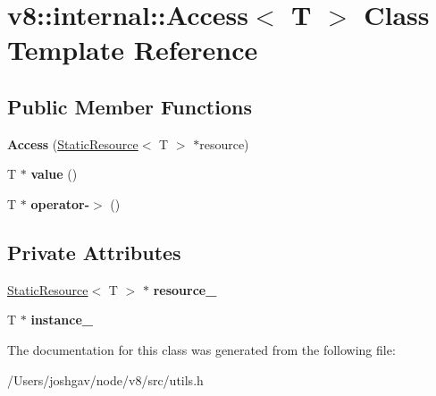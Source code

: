 \hypertarget{classv8_1_1internal_1_1_access}{}\section{v8\+:\+:internal\+:\+:Access$<$ T $>$ Class Template Reference}
\label{classv8_1_1internal_1_1_access}
\subsection*{Public Member Functions}
\begin{DoxyCompactItemize}
\item 
{\bfseries Access} (\hyperlink{classv8_1_1internal_1_1_static_resource}{Static\+Resource}$<$ T $>$ $\ast$resource)\hypertarget{classv8_1_1internal_1_1_access_a73d4e4a39835cc3d2314a328d80d0073}{}\label{classv8_1_1internal_1_1_access_a73d4e4a39835cc3d2314a328d80d0073}

\item 
T $\ast$ {\bfseries value} ()\hypertarget{classv8_1_1internal_1_1_access_ab9a3512d394b376ccba107df5f3c3d67}{}\label{classv8_1_1internal_1_1_access_ab9a3512d394b376ccba107df5f3c3d67}

\item 
T $\ast$ {\bfseries operator-\/$>$} ()\hypertarget{classv8_1_1internal_1_1_access_a71f5c7a9a355f726f309a13a5b6a8ab4}{}\label{classv8_1_1internal_1_1_access_a71f5c7a9a355f726f309a13a5b6a8ab4}

\end{DoxyCompactItemize}
\subsection*{Private Attributes}
\begin{DoxyCompactItemize}
\item 
\hyperlink{classv8_1_1internal_1_1_static_resource}{Static\+Resource}$<$ T $>$ $\ast$ {\bfseries resource\+\_\+}\hypertarget{classv8_1_1internal_1_1_access_af4bb6967363005f70e5377603c1e9677}{}\label{classv8_1_1internal_1_1_access_af4bb6967363005f70e5377603c1e9677}

\item 
T $\ast$ {\bfseries instance\+\_\+}\hypertarget{classv8_1_1internal_1_1_access_a554eca372f1a8dfe0dd35fc7206e94a2}{}\label{classv8_1_1internal_1_1_access_a554eca372f1a8dfe0dd35fc7206e94a2}

\end{DoxyCompactItemize}


The documentation for this class was generated from the following file\+:\begin{DoxyCompactItemize}
\item 
/\+Users/joshgav/node/v8/src/utils.\+h\end{DoxyCompactItemize}
